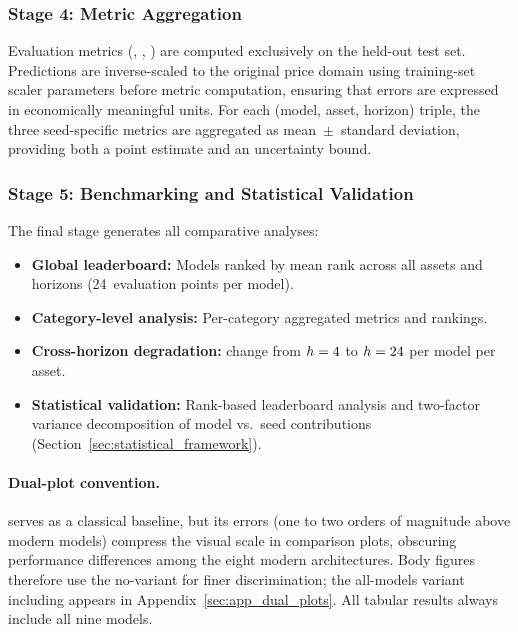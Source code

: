 \subsubsection{Stage 4: Metric Aggregation}
\label{sec:stage4_aggregation}

Evaluation metrics (\rmse, \mae, \da) are computed exclusively on the held-out test set.  Predictions are inverse-scaled to the original price domain using training-set scaler parameters before metric computation, ensuring that errors are expressed in economically meaningful units.  For each (model, asset, horizon) triple, the three seed-specific metrics are aggregated as mean~$\pm$~standard deviation, providing both a point estimate and an uncertainty bound.

\subsubsection{Stage 5: Benchmarking and Statistical Validation}
\label{sec:stage5_benchmark}

The final stage generates all comparative analyses:

\begin{itemize}[nosep]
  \item \textbf{Global leaderboard:} Models ranked by mean \rmse rank across all \nassets assets and \nhorizons horizons (24~evaluation points per model).
  \item \textbf{Category-level analysis:} Per-category aggregated metrics and rankings.
  \item \textbf{Cross-horizon degradation:} \rmse change from $h=4$ to $h=24$ per model per asset.
  \item \textbf{Statistical validation:} Rank-based leaderboard analysis and two-factor variance decomposition of model vs.\ seed contributions (Section~\ref{sec:statistical_framework}).
\end{itemize}

\paragraph{Dual-plot convention.}  \lstm serves as a classical baseline, but its errors (one to two orders of magnitude above modern models) compress the visual scale in comparison plots, obscuring performance differences among the eight modern architectures.  Body figures therefore use the no-\lstm variant for finer discrimination; the all-models variant including \lstm appears in Appendix~\ref{sec:app_dual_plots}.  All tabular results always include all nine models.

